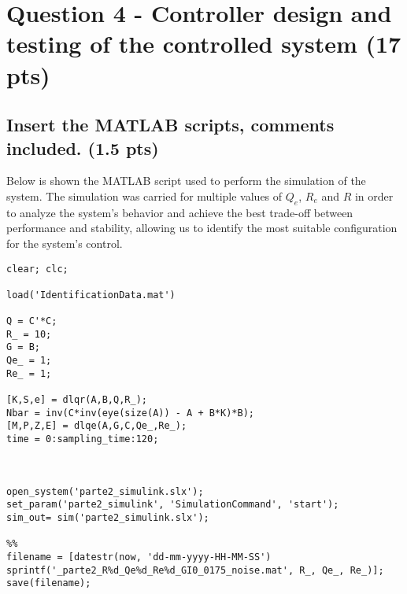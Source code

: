 \section{Question 4 - Controller design and testing of the controlled system (17 pts)}
\label{sec:q4}

\subsection{Insert the MATLAB scripts, comments included. (1.5 pts)}
\vspace{10pt}


Below is shown the MATLAB script used to perform the simulation of the system. The simulation was carried for multiple values of $Q_{e}$, $R_{e}$ and $R$ in order to analyze the system's behavior and achieve the best trade-off between performance and stability, allowing us to identify the most suitable configuration for the system's control.

\begin{lstlisting}
clear; clc;

load('IdentificationData.mat')

Q = C'*C;
R_ = 10;
G = B;
Qe_ = 1;
Re_ = 1;

[K,S,e] = dlqr(A,B,Q,R_);
Nbar = inv(C*inv(eye(size(A)) - A + B*K)*B);
[M,P,Z,E] = dlqe(A,G,C,Qe_,Re_);
time = 0:sampling_time:120;



open_system('parte2_simulink.slx');
set_param('parte2_simulink', 'SimulationCommand', 'start');
sim_out= sim('parte2_simulink.slx');

%%
filename = [datestr(now, 'dd-mm-yyyy-HH-MM-SS') sprintf('_parte2_R%d_Qe%d_Re%d_GI0_0175_noise.mat', R_, Qe_, Re_)];
save(filename);
\end{lstlisting}